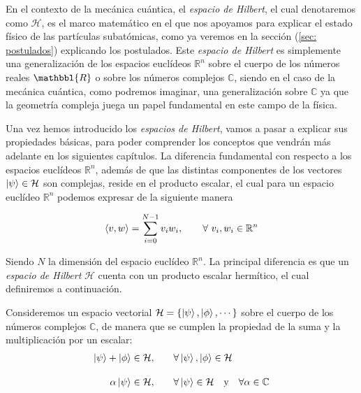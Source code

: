 \documentclass{article}
\numberwithin{equation}{section} %
\begin{document}
    En el contexto de la mecánica cuántica, el \textit{espacio de Hilbert}, el cual denotaremos como \( \mathcal{H} \), es el marco matemático en el que nos apoyamos para explicar el estado físico de las partículas subatómicas, como ya veremos en la sección (\ref{sec: postulados}) explicando los postulados. Este \textit{espacio de Hilbert} es simplemente una generalización de los espacios euclídeos \( \mathbb{R}^{n} \) sobre el cuerpo de los números reales \( \mathbbl{R} \) o sobre los números complejos \( \mathbb{C} \), siendo en el caso de la mecánica cuántica, como podremos imaginar, una generalización sobre \( \mathbb{C} \) ya que la geometría compleja juega un papel fundamental en este campo de la física.
    
    \vspace{5mm}

    Una vez hemos introducido los \textit{espacios de Hilbert}, vamos a pasar a explicar sus propiedades básicas, para poder comprender los conceptos que vendrán más adelante en los siguientes capítulos. La diferencia fundamental con respecto a los espacios euclídeos \( \mathbb{R}^{n} \), además de que las distintas componentes de los vectores \( \ket{\psi} \in \mathcal{H} \) son complejas, reside en el producto escalar, el cual para un espacio euclídeo \( \mathbb{R}^{n} \) podemos expresar de la siguiente manera

    \begin{equation*}
        \braket{v, w} = \sum_{i = 0}^{N - 1} v_{i} w_{i}, \qquad \forall \ v_{i}, w_{i} \in \mathbb{R}^{n}
    \end{equation*}

    \vspace{2.5mm}

    Siendo \( N \) la dimensión del espacio euclídeo \( \mathbb{R}^{n} \). La principal diferencia es que un \textit{espacio de Hilbert} \( \mathcal{H} \) cuenta con un producto escalar hermítico, el cual definiremos a continuación.

    \vspace{5mm}

    Consideremos un espacio vectorial \( \mathcal{H} = \{ \ket{\psi}, \ket{\phi}, \cdots \} \) sobre el cuerpo de los números complejos \( \mathbb{C} \), de manera que se cumplen la propiedad de la suma y la multiplicación por un escalar:
    \begin{align*}
        \ket{\psi} + \ket{\phi} \in \mathcal{H}, \qquad &\forall \ket{\psi}, \ket{\phi} \in \mathcal{H}\\[10pt]
        \alpha \ket{\psi} \in \mathcal{H}, \qquad &\forall \ket{\psi} \in \mathcal{H} \quad \text{y} \quad \forall \alpha \in \mathbb{C}
    \end{align*}
\end{document}
